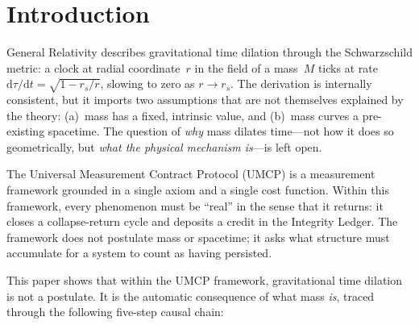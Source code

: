 \documentclass[
  aps,
  prd,
  twocolumn,
  superscriptaddress,
  nofootinbib,
  floatfix
]{revtex4-2}
\newcommand{\dd}{\mathrm{d}}
\begin{document}
\section{Introduction}\label{sec:intro}

General Relativity \cite{einstein1916gr} describes gravitational
time dilation through the Schwarzschild metric: a clock at
radial coordinate~$r$ in the field of a mass~$M$ ticks at rate
$\dd\tau/\dd t = \sqrt{1 - r_s/r}$, slowing to zero as $r \to
r_s$.  The derivation is internally consistent, but it imports
two assumptions that are not themselves explained by the theory:
(a)~mass has a fixed, intrinsic value, and (b)~mass curves a
pre-existing spacetime.  The question of \emph{why} mass
dilates time---not how it does so geometrically, but \emph{what
the physical mechanism is}---is left open.

The Universal Measurement Contract Protocol (UMCP)
\cite{paulus2025umcp,paulus2025physicscoherence} is a
measurement framework grounded in a single axiom and a single
cost function.  Within this framework, every phenomenon must
be ``real'' in the sense that it returns: it closes a
collapse-return cycle and deposits a credit in the Integrity
Ledger.  The framework does not postulate mass or spacetime; it
asks what structure must accumulate for a system to count as
having persisted.

This paper shows that within the UMCP framework, gravitational
time dilation is not a postulate.  It is the automatic
consequence of what mass \emph{is}, traced through the
following five-step causal chain:
\end{document}
